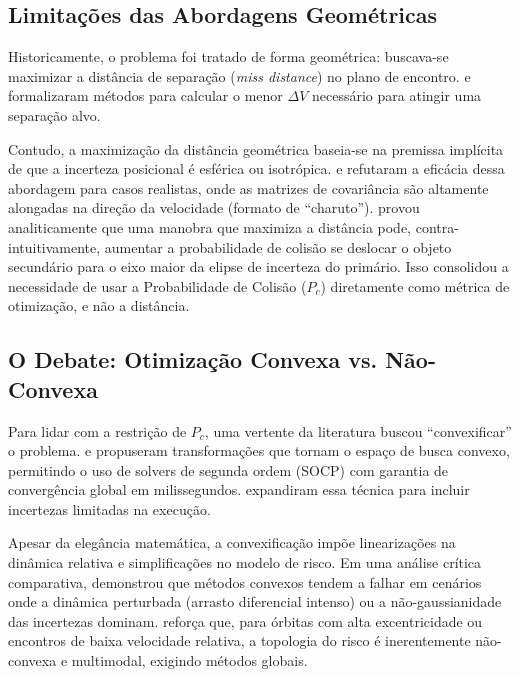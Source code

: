 \subsection{Limitações das Abordagens Geométricas}

Historicamente, o problema foi tratado de forma geométrica: buscava-se maximizar a distância de separação (\textit{miss distance}) no plano de encontro.  e  formalizaram métodos para calcular o menor $\Delta V$ necessário para atingir uma separação alvo.

Contudo, a maximização da distância geométrica baseia-se na premissa implícita de que a incerteza posicional é esférica ou isotrópica.  e  refutaram a eficácia dessa abordagem para casos realistas, onde as matrizes de covariância são altamente alongadas na direção da velocidade (formato de ``charuto'').  provou analiticamente que uma manobra que maximiza a distância pode, contra-intuitivamente, aumentar a probabilidade de colisão se deslocar o objeto secundário para o eixo maior da elipse de incerteza do primário. Isso consolidou a necessidade de usar a Probabilidade de Colisão ($P_c$) diretamente como métrica de otimização, e não a distância.

\subsection{O Debate: Otimização Convexa vs. Não-Convexa}

Para lidar com a restrição de $P_c$, uma vertente da literatura buscou ``convexificar'' o problema.  e  propuseram transformações que tornam o espaço de busca convexo, permitindo o uso de solvers de segunda ordem (SOCP) com garantia de convergência global em milissegundos.  expandiram essa técnica para incluir incertezas limitadas na execução.

Apesar da elegância matemática, a convexificação impõe linearizações na dinâmica relativa e simplificações no modelo de risco. Em uma análise crítica comparativa,  demonstrou que métodos convexos tendem a falhar em cenários onde a dinâmica perturbada (arrasto diferencial intenso) ou a não-gaussianidade das incertezas dominam.  reforça que, para órbitas com alta excentricidade ou encontros de baixa velocidade relativa, a topologia do risco é inerentemente não-convexa e multimodal, exigindo métodos globais.

